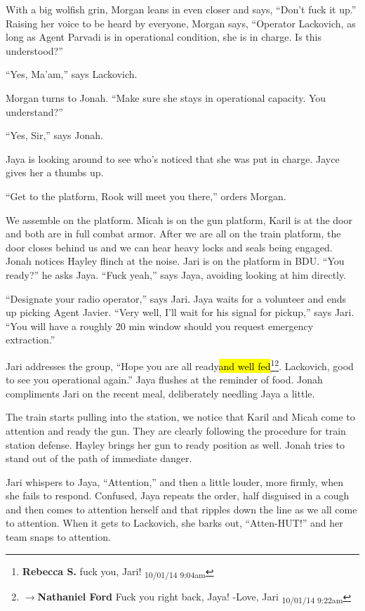 With a big wolfish grin, Morgan leans in even closer and says, ``Don't fuck it up.''  Raising her voice to be heard by everyone, Morgan says, ``Operator Lackovich, as long as Agent Parvadi is in operational condition, she is in charge. Is this understood?''

``Yes, Ma'am,'' says Lackovich.

Morgan turns to Jonah.  ``Make sure she stays in operational capacity.  You understand?''

``Yes, Sir,'' says Jonah.

Jaya is looking around to see who's noticed that she was put in charge.  Jayce gives her a thumbs up.

``Get to the platform, Rook will meet you there,'' orders Morgan.



We assemble on the platform.  Micah is on the gun platform, Karil is at the door and both are in full combat armor.  After we are all on the train platform, the door closes behind us and we can hear heavy locks and seals being engaged. Jonah notices Hayley flinch at the noise.  Jari is on the platform in BDU.  ``You ready?'' he asks Jaya.  ``Fuck yeah,'' says Jaya, avoiding looking at him directly.

``Designate your radio operator,'' says Jari.  Jaya waits for a volunteer and ends up picking Agent Javier.   ``Very well, I'll wait for his signal for pickup,'' says Jari.  ``You will have a roughly 20 min window should you request emergency extraction.''

Jari addresses the group, ``Hope you are all ready\hl{and well fed}\footnote{\textbf{Rebecca S. }fuck you, Jari! \textsubscript{10/01/14 9:04am}}\footnote{$\rightarrow$\textbf{Nathaniel Ford }Fuck you right back, Jaya! -Love, Jari \textsubscript{10/01/14 9:22am}}.  Lackovich, good to see you operational again.''  Jaya flushes at the reminder of food.  Jonah compliments Jari on the recent meal, deliberately needling Jaya a little.

The train starts pulling into the station, we notice that Karil and Micah come to attention and ready the gun. They are clearly following the procedure for train station defense.  Hayley brings her gun to ready position as well.  Jonah tries to stand out of the path of immediate danger.

Jari whispers to Jaya, ``Attention,'' and then a little louder, more firmly, when she fails to respond.  Confused, Jaya repeats the order, half disguised in a cough and then comes to attention herself and that ripples down the line as we all come to attention.  When it gets to Lackovich, she barks out, ``Atten-HUT!'' and her team snaps to attention.



